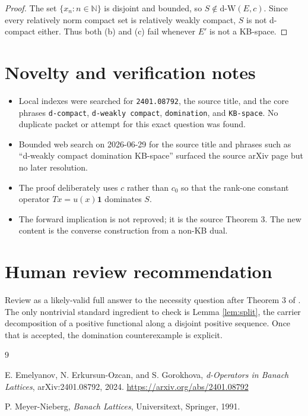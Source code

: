 \documentclass[11pt]{amsart}
\theoremstyle{remark}
\newcommand{\dW}{\mathrm{d\mbox{-}W}}
\newcommand{\N}{\mathbb N}
\begin{document}
\begin{proof}
The set $\{x_n:n\in\N\}$ is disjoint and bounded, so $S\notin\dW(E,c)$.  Since
every relatively norm compact set is relatively weakly compact, $S$ is not
d-compact either.  Thus both (b) and (c) fail whenever $E'$ is not a KB-space.
\end{proof}

\section*{Novelty and verification notes}

\begin{itemize}[leftmargin=*]
\item Local indexes were searched for \texttt{2401.08792}, the source title,
and the core phrases \texttt{d-compact}, \texttt{d-weakly compact},
\texttt{domination}, and \texttt{KB-space}.  No duplicate packet or attempt for
this exact question was found.
\item Bounded web search on 2026-06-29 for the source title and phrases such
as ``d-weakly compact domination KB-space'' surfaced the source arXiv page but
no later resolution.
\item The proof deliberately uses $c$ rather than $c_0$ so that the rank-one
constant operator $Tx=u(x)\mathbf 1$ dominates $S$.
\item The forward implication is not reproved; it is the source Theorem 3.
The new content is the converse construction from a non-KB dual.
\end{itemize}

\section*{Human review recommendation}

Review as a likely-valid full answer to the necessity question after Theorem 3
of \cite{EEG2024}.  The only nontrivial standard ingredient to check is Lemma
\ref{lem:split}, the carrier decomposition of a positive functional along a
disjoint positive sequence.  Once that is accepted, the domination
counterexample is explicit.

\begin{thebibliography}{9}

E. Emelyanov, N. Erkursun-Ozcan, and S. Gorokhova,
\emph{d-Operators in Banach Lattices},
arXiv:2401.08792, 2024.
\url{https://arxiv.org/abs/2401.08792}

P. Meyer-Nieberg,
\emph{Banach Lattices},
Universitext, Springer, 1991.

\end{thebibliography}
\end{document}
